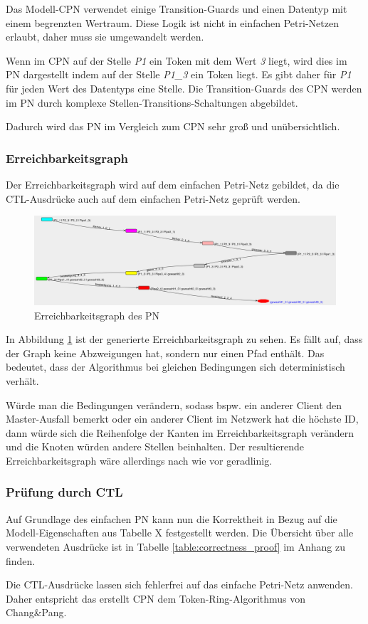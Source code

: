 Das Modell-CPN verwendet einige Transition-Guards und einen Datentyp mit einem begrenzten Wertraum. Diese Logik ist nicht in einfachen Petri-Netzen erlaubt, daher muss sie umgewandelt werden.

Wenn im CPN auf der Stelle \textit{P1} ein Token mit dem Wert \textit{3} liegt, wird dies im PN dargestellt indem auf der Stelle \textit{P1\_3} ein Token liegt. Es gibt daher für \textit{P1} für jeden Wert des Datentyps eine Stelle. Die Transition-Guards des CPN werden im PN durch komplexe Stellen-Transitions-Schaltungen abgebildet.

Dadurch wird das PN im Vergleich zum CPN sehr groß und unübersichtlich.

\subsubsection{Erreichbarkeitsgraph}
Der Erreichbarkeitsgraph wird auf dem einfachen Petri-Netz gebildet, da die CTL-Ausdrücke auch auf dem einfachen Petri-Netz geprüft werden.

\begin{figure}[H]
\centering
\includegraphics[width=1\linewidth]{reachibility_graph}
\caption{Erreichbarkeitsgraph des PN}
\label{fig:reachibility_graph}
\end{figure}

In Abbildung \ref{fig:reachibility_graph} ist der generierte Erreichbarkeitsgraph zu sehen. Es fällt auf, dass der Graph keine Abzweigungen hat, sondern nur einen Pfad enthält. Das bedeutet, dass der Algorithmus bei gleichen Bedingungen sich deterministisch verhält.

Würde man die Bedingungen verändern, sodass bspw. ein anderer Client den Master-Ausfall bemerkt oder ein anderer Client im Netzwerk hat die höchste ID, dann würde sich die Reihenfolge der Kanten im Erreichbarkeitsgraph verändern und die Knoten würden andere Stellen beinhalten. Der resultierende Erreichbarkeitsgraph wäre allerdings nach wie vor geradlinig.

\subsubsection{Prüfung durch CTL}
Auf Grundlage des einfachen PN kann nun die Korrektheit in Bezug auf die Modell-Eigenschaften aus Tabelle X festgestellt werden. Die Übersicht über alle verwendeten Ausdrücke ist in Tabelle \ref{table:correctness_proof} im Anhang zu finden.

Die CTL-Ausdrücke lassen sich fehlerfrei auf das einfache Petri-Netz anwenden. Daher entspricht das erstellt CPN dem Token-Ring-Algorithmus von Chang\&Pang.
